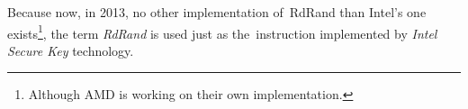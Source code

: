 Because now, in 2013, no other implementation of~RdRand than Intel's one exists\footnote{Although AMD is working on their own implementation.},%
the term {\em RdRand} is used just as the~instruction implemented by {\em Intel Secure Key} technology.



